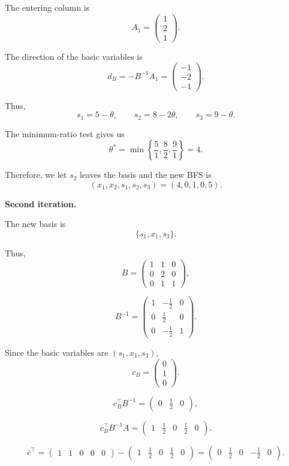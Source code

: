 \documentclass{article}
\begin{document}
The entering column is
\[
A_1=
\begin{pmatrix}
1\\
2\\
1
\end{pmatrix}.
\]

The direction of the basic variables is
\[
d_B=-B^{-1}A_1
=
\begin{pmatrix}
-1\\
-2\\
-1
\end{pmatrix}.
\]

Thus,
\[
s_1=5-\theta,
\qquad
s_2=8-2\theta,
\qquad
s_3=9-\theta.
\]

The minimum-ratio test gives us 
\[
\theta^*
=
\min\left\{
\frac{5}{1},
\frac{8}{2},
\frac{9}{1}
\right\}
=4.
\]

Therefore, we let $s_2$ leaves the basis and the new BFS is
\[
(x_1,x_2,s_1,s_2,s_3)
=
(4,0,1,0,5).
\]

\textbf{Second iteration.}

The new basis is
\[
\{s_1,x_1,s_3\}.
\]

Thus,
\[
B=
\begin{pmatrix}
1&1&0\\
0&2&0\\
0&1&1
\end{pmatrix},
\]

\[
B^{-1}
=
\begin{pmatrix}
1&-\frac12&0\\
0&\frac12&0\\
0&-\frac12&1
\end{pmatrix}.
\]

Since the basic variables are $(s_1,x_1,s_3)$,
\[
c_B=
\begin{pmatrix}
0\\
1\\
0
\end{pmatrix}.
\]


\[
c_B^\top B^{-1}
=
\begin{pmatrix}
0&\frac12&0
\end{pmatrix},
\]

\[
c_B^\top B^{-1}A
=
\begin{pmatrix}
1&\frac12&0&\frac12&0
\end{pmatrix}.
\]

\[
\bar c^\top
=
\begin{pmatrix}
1&1&0&0&0
\end{pmatrix}
-
\begin{pmatrix}
1&\frac12&0&\frac12&0
\end{pmatrix}
=
\begin{pmatrix}
0&\frac12&0&-\frac12&0
\end{pmatrix}.
\]
\end{document}
